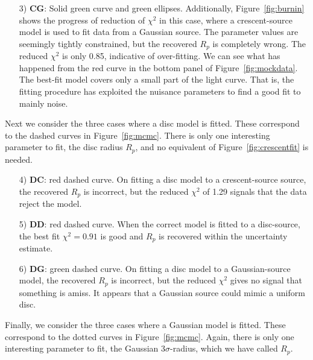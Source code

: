 \begin{enumerate}
\item[3) {\bf CG}:] Solid green curve and green ellipses.
  Additionally, Figure~\ref{fig:burnin} shows the progress of
  reduction of $\chi^2$ in this case, where a crescent-source model is
  used to fit data from a Gaussian source.  The parameter values are
  seemingly tightly constrained, but the recovered $R_p$ is completely
  wrong.  The reduced $\chi^2$ is only 0.85, indicative of
  over-fitting.  We can see what has happened from the red curve in
  the bottom panel of Figure~\ref{fig:mockdata}.  The best-fit model
  covers only a small part of the light curve.  That is, the fitting
  procedure has exploited the nuisance parameters to find a good fit
  to mainly noise.

\end{enumerate}

Next we consider the three cases where a disc model is fitted.  These
correspond to the dashed curves in Figure~\ref{fig:mcmc}.  There is
only one interesting parameter to fit, the disc radius $R_p$, and no
equivalent of Figure~\ref{fig:crescentfit} is needed. 

\begin{enumerate}

\item[4) {\bf DC}:] red dashed curve.  On fitting a disc model to a
  crescent-source source, the recovered $R_p$ is incorrect, but the
  reduced $\chi^2$ of 1.29 signals that the data reject the model.

\item[5) {\bf DD}:] red dashed curve.  When the correct model is
  fitted to a disc-source, the best fit $\chi^2=0.91$ is good and
  $R_p$ is recovered within the uncertainty estimate.

\item[6) {\bf DG}:] green dashed curve.  On fitting a disc model to a
  Gaussian-source model, the recovered $R_p$ is incorrect, but the
  reduced $\chi^2$ gives no signal that something is amiss.  It
  appears that a Gaussian source could mimic a uniform disc.

\end{enumerate}

Finally, we consider the three cases where a Gaussian model is fitted.
These correspond to the dotted curves in Figure~\ref{fig:mcmc}.  Again,
there is only one interesting parameter to fit, the Gaussian
$3\sigma$-radius, which we have called $R_p$.


